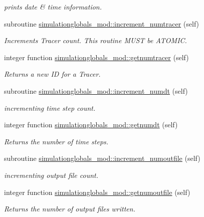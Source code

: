 \begin{DoxyCompactItemize}
\begin{DoxyCompactList}\small\item\em prints date \& time information. \end{DoxyCompactList}\item 
subroutine \mbox{\hyperlink{namespacesimulationglobals__mod_a3f11ed9f7735018950e1921ead871269}{simulationglobals\+\_\+mod\+::increment\+\_\+numtracer}} (self)
\begin{DoxyCompactList}\small\item\em Increments Tracer count. This routine M\+U\+ST be A\+T\+O\+M\+IC. \end{DoxyCompactList}\item 
integer function \mbox{\hyperlink{namespacesimulationglobals__mod_ac4915156236196940b31ff02d53af295}{simulationglobals\+\_\+mod\+::getnumtracer}} (self)
\begin{DoxyCompactList}\small\item\em Returns a new ID for a Tracer. \end{DoxyCompactList}\item 
subroutine \mbox{\hyperlink{namespacesimulationglobals__mod_ad983ee8885b275c6fa1369f1e158e078}{simulationglobals\+\_\+mod\+::increment\+\_\+numdt}} (self)
\begin{DoxyCompactList}\small\item\em incrementing time step count. \end{DoxyCompactList}\item 
integer function \mbox{\hyperlink{namespacesimulationglobals__mod_af313959d6cbfc4cb0ab330aa094511c5}{simulationglobals\+\_\+mod\+::getnumdt}} (self)
\begin{DoxyCompactList}\small\item\em Returns the number of time steps. \end{DoxyCompactList}\item 
subroutine \mbox{\hyperlink{namespacesimulationglobals__mod_a77d7175bc03e472ee9a00ee9f6ff1b0e}{simulationglobals\+\_\+mod\+::increment\+\_\+numoutfile}} (self)
\begin{DoxyCompactList}\small\item\em incrementing output file count. \end{DoxyCompactList}\item 
integer function \mbox{\hyperlink{namespacesimulationglobals__mod_a2b76dc3e6cbf1256253c54903df8393b}{simulationglobals\+\_\+mod\+::getnumoutfile}} (self)
\begin{DoxyCompactList}\small\item\em Returns the number of output files written. \end{DoxyCompactList}\item 

\end{DoxyCompactItemize}
